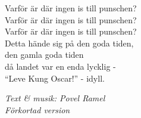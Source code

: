 \vspace{10pt}
Varför är där ingen is till punschen?\\
Varför är där ingen is till punschen?\\
Varför är där ingen is till punschen?\\
Detta hände sig på den goda tiden,\\
den gamla goda tiden\\
då landet var en enda lycklig -\\
``Leve Kung Oscar!'' - idyll.\par
\vspace{10pt}
{\footnotesize\textit{Text \& musik: Povel Ramel\\Förkortad version}}
